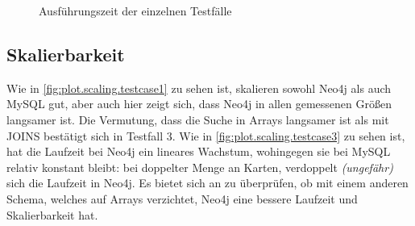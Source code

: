 \begin{figure}[t]
    \myfloatalign
    \caption{Ausführungszeit der einzelnen Testfälle}
    \label{fig:plot.runtime}
\end{figure}


\subsection{Skalierbarkeit}
Wie in \autoref{fig:plot.scaling.testcase1} zu sehen ist, skalieren sowohl Neo4j als auch MySQL gut, aber auch hier zeigt sich, dass Neo4j in allen gemessenen Größen langsamer ist. Die Vermutung, dass die Suche in Arrays langsamer ist als mit JOINS bestätigt sich in Testfall 3. Wie in  \autoref{fig:plot.scaling.testcase3} zu sehen ist, hat die Laufzeit bei Neo4j ein lineares Wachstum, wohingegen sie bei MySQL relativ konstant bleibt: bei doppelter Menge an Karten, verdoppelt \emph{(ungefähr)} sich die Laufzeit in Neo4j. Es bietet sich an zu überprüfen, ob mit einem anderen Schema, welches auf Arrays verzichtet, Neo4j eine bessere Laufzeit und Skalierbarkeit hat.

